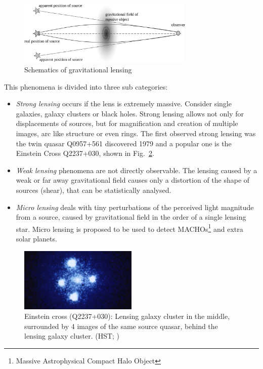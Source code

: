 \documentclass[11pt]{article}
\begin{document}
\begin{figure}[h]
	\centering
		\includegraphics[width=0.75\textwidth]{img/grav_lens}
	\caption{Schematics of gravitational lensing}
	\label{fig:grav_lens}
\end{figure}

This phenomena is divided into three sub categories:
\begin{itemize}
  \item
    \emph{Strong lensing} occurs if the lens is extremely massive. Consider single galaxies, galaxy clusters or black holes.
    Strong lensing allows not only for displacements of sources, but for magnification and creation of multiple images, arc like structure or even rings.
    The first observed strong lensing was the twin quasar Q0957+561 discovered 1979\cite{walsh19790957} and a popular one is the Einstein Cross Q2237+030\cite{ec1985}, shown in Fig.~\ref{fig:einsteinc}.
  \item
    \emph{Weak lensing} phenomena are not directly observable.
    The lensing caused by a weak or far away gravitational field causes only a distortion of the shape of sources (shear), that can be statistically analysed.
  \item
    \emph{Micro lensing} deals with tiny perturbations of the perceived light magnitude from a source, caused by gravitational field in the order of a single lensing star.
    Micro lensing is proposed to be used to detect MACHOs\footnote{Massive Astrophysical Compact Halo Object} and extra solar planets.
\end{itemize}

\begin{figure}[h]
	\centering
		\includegraphics[width=0.5\textwidth]{img/einstein_cross}
	\caption{Einstein cross (Q2237+030): Lensing galaxy cluster in the middle, surrounded by 4 images of the same source quasar, behind the lensing galaxy cluster. (HST; \cite{ec1985})}
	\label{fig:einsteinc}
\end{figure}
\end{document}
